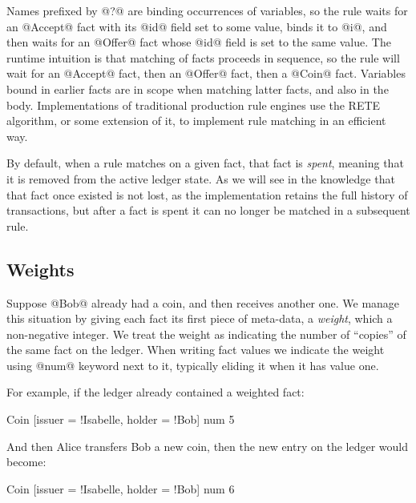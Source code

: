 Names prefixed by @?@ are binding occurrences of variables, so the rule waits for an @Accept@ fact with its @id@ field set to some value, binds it to @i@, and then waits for an @Offer@ fact whose @id@ field is set to the same value. The runtime intuition is that matching of facts proceeds in sequence, so the rule will wait for an @Accept@ fact, then an @Offer@ fact, then a @Coin@ fact. Variables bound in earlier facts are in scope when matching latter facts, and also in the body. Implementations of traditional production rule engines use the RETE~\cite{Forgy1981:RETE} algorithm, or some extension of it, to implement rule matching in an efficient way.

By default, when a rule matches on a given fact, that fact is \emph{spent}, meaning that it is removed from the active ledger state. As we will see in \REF the knowledge that that fact once existed is not lost, as the implementation retains the full history of transactions, but after a fact is spent it can no longer be matched in a subsequent rule.


\subsection{Weights}
\label{s:Weights}
Suppose @Bob@ already had a coin, and then receives another one. We manage this situation by giving each fact its first piece of meta-data, a \emph{weight}, which a non-negative integer. We treat the weight as indicating the number of ``copies'' of the same fact on the ledger. When writing fact values we indicate the weight using @num@ keyword next to it, typically eliding it when it has value one.

For example, if the ledger already contained a weighted fact:
\begin{small}
\begin{code}
 Coin [issuer = !Isabelle, holder = !Bob] num 5
\end{code}
\end{small}
%
And then Alice transfers Bob a new coin, then the new entry on the ledger would become:
\begin{small}
\begin{code}
 Coin [issuer = !Isabelle, holder = !Bob] num 6
\end{code}
\end{small}
%


